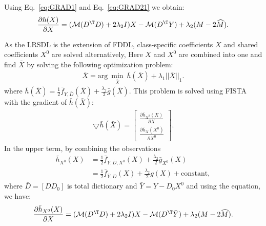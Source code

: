 \noindent
Using Eq.~\eqref{eq:GRAD1} and Eq.~\eqref{eq:GRAD21} we obtain:
\begin{equation}
\begin{aligned}
\frac{\partial h(X)}{\partial X} = (\mathcal{M} (D^\T D) + 2 \lambda_2 I)X - \mathcal{M}(D^\T Y)+\lambda_2(M-2 \widehat{M}).
\end{aligned}
\label{eq:GRAD2}
\end{equation}

As the LRSDL is the extension of FDDL, class-specific coefficients $X$ and shared coefficients $X^0$ are solved alternatively, Here $X$ and $X^0$ are combined into one and find $\bar{X}$ by solving the following optimization problem:%
\begin{equation}
\begin{aligned}
\bar{X} = \mathrm{arg}\ \underset{\bar{X}}{\min}\ {\bar{h}(\bar{X})} + \lambda_1 ||\bar{X}||_1.
\end{aligned}
\label{eq:GRAD3}
\end{equation}
where $\bar{h}(\bar{X}) = \frac{1}{2} \bar{f}_{Y,\bar{D}}(\bar{X}) + \frac{\lambda_2}{2}\bar{g}(\bar{X})$. This problem is solved using FISTA with the gradient of $\bar{h}(\bar{X})$:
\begin{equation}
\begin{aligned}
\bigtriangledown \bar{h}(\bar{X}) = 
\begin{bmatrix} \frac{\partial \bar{h}_{X^0}(X)}{\partial X} \\ \frac{\partial \bar{h}_{X}(X^0)}{\partial X^0} \end{bmatrix}.
\end{aligned}
\label{eq:GRAD4}
\end{equation}
\noindent
In the upper term, by combining the observations
\begin{equation}
\begin{aligned}
\bar{h}_{X^0}(X) & = \frac{1}{2}\bar{f}_{Y, \bar{D},X^0} (X) + \frac{\lambda_2}{2}\bar{g}_{X^0}(X)\\
& = \frac{1}{2}\bar{f}_{\bar{Y},{D}} (X) + \frac{\lambda_2}{2}{g}(X) + \text{constant},
\end{aligned}
\label{eq:GRAD5}
\end{equation}
where $\bar{D} = [D D_0]$ is total dictionary  and $\bar{Y} = Y - D_0X^0$ 
and using the equation, we have:
\begin{equation}
\begin{aligned}
\frac{\partial \bar{h}_{X^0}(X)}{\partial X} = (\mathcal{M} (D^\T D) + 2 \lambda_2 I)X - \mathcal{M}(D^\T \bar{Y})+\lambda_2(M-2 \widehat{M}).
\end{aligned}
\label{eq:GRAD6}
\end{equation}
